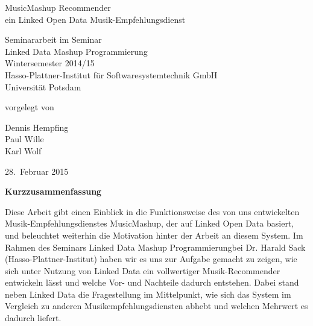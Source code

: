 \documentclass[11pt, a4paper]{article}
\begin{document}
          

\begin{titlepage}
  \begin{center} 
    \mbox{}
    \vspace{1cm}
    
    {\huge MusicMashup Recommender \\[1em] {\LARGE ein Linked Open Data Musik-Empfehlungsdienst}}  
        
    \vspace{5cm}
    
    Seminararbeit im Seminar \\[1em]
    {\large \sc Linked Data Mashup Programmierung} \\[1em]
    Wintersemester 2014/15 \\[1em]
    Hasso-Plattner-Institut für Softwaresystemtechnik GmbH \\[1em]
    Universität Potsdam
    
    \vspace{4cm}
    
		vorgelegt von
		
    \vspace{1em}
    
        {\Large Dennis Hempfing} \\
		{\Large Paul Wille} \\
		{\Large Karl Wolf}
		
    \vspace{4em}
    
    28.~Februar 2015
  \end{center}
\end{titlepage}


\setcounter{page}{1}

\begin{center}
{\bf Kurzzusammenfassung} 
\end{center}

\noindent
Diese Arbeit gibt einen Einblick in die Funktionsweise des von uns entwickelten Musik-Empfehlungsdienstes MusicMashup, der auf Linked Open Data basiert, und beleuchtet weiterhin die Motivation hinter der Arbeit an diesem System. Im Rahmen des Seminars \glqq Linked Data Mashup Programmierung\grqq bei Dr. Harald Sack (Hasso-Plattner-Institut) haben wir es uns zur Aufgabe gemacht zu zeigen, wie sich unter Nutzung von Linked Data ein vollwertiger Musik-Recommender entwickeln lässt und welche Vor- und Nachteile dadurch entstehen.
Dabei stand neben Linked Data die Fragestellung im Mittelpunkt, wie sich das System im Vergleich zu anderen Musikempfehlungsdiensten abhebt und welchen Mehrwert es dadurch liefert.
\end{document}
